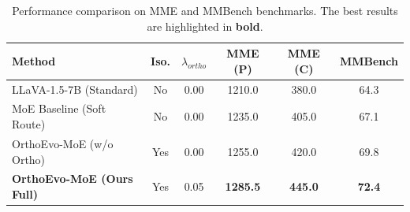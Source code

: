 \begin{table}[t]
  \centering
  \caption{Performance comparison on MME and MMBench benchmarks. The best results are highlighted in \textbf{bold}.}
  \label{tab:main_results}
  \begin{tabular}{lccccc}
    \toprule
    \textbf{Method} & \textbf{Iso.} & $\lambda_{ortho}$ & \textbf{MME (P)} & \textbf{MME (C)} & \textbf{MMBench} \\
    \midrule
    LLaVA-1.5-7B (Standard) & No & 0.00 & 1210.0 & 380.0 & 64.3 \\
    MoE Baseline (Soft Route) & No & 0.00 & 1235.0 & 405.0 & 67.1 \\
    OrthoEvo-MoE (w/o Ortho) & Yes & 0.00 & 1255.0 & 420.0 & 69.8 \\
    \textbf{OrthoEvo-MoE (Ours Full)} & Yes & 0.05 & \textbf{1285.5} & \textbf{445.0} & \textbf{72.4} \\
    \bottomrule
  \end{tabular}
\end{table}
